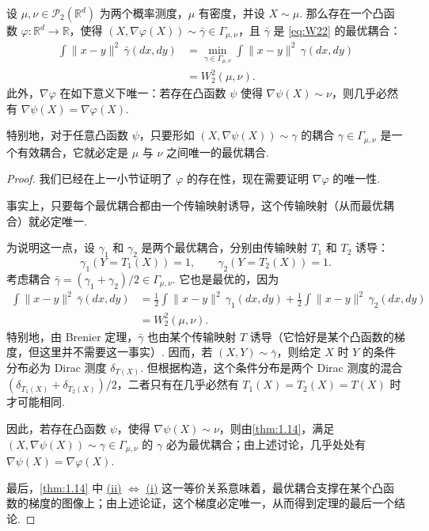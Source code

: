 \begin{theorem}\label{thm:1.16}
设 $\mu,\nu\in\mathcal{P}_2(\mathbb{R}^d)$ 为两个概率测度，$\mu$ 有密度，并设 $X\sim\mu$. 那么存在一个凸函数 $\varphi:\mathbb{R}^d\to\mathbb{R}$，使得 $(X,\nabla\varphi(X))\sim\bar\gamma\in\Gamma_{\mu,\nu}$，且 $\bar\gamma$ 是 \eqref{eq:W22} 的最优耦合：
$$
\begin{aligned}
\int\|x-y\|^2\,\bar\gamma(dx,dy)
&=\min_{\gamma\in\Gamma_{\mu,\nu}}\int\|x-y\|^2\,\gamma(dx,dy)\\
&=W_2^2(\mu,\nu).
\end{aligned}
$$
此外，$\nabla\varphi$ 在如下意义下唯一：若存在凸函数 $\psi$ 使得 $\nabla\psi(X)\sim\nu$，则几乎必然有 $\nabla\psi(X)=\nabla\varphi(X)$.

特别地，对于任意凸函数 $\psi$，只要形如 $(X,\nabla\psi(X))\sim\gamma$ 的耦合 $\gamma\in\Gamma_{\mu,\nu}$ 是一个有效耦合，它就必定是 $\mu$ 与 $\nu$ 之间唯一的最优耦合.
\end{theorem}
\begin{proof}
我们已经在上一小节证明了 $\varphi$ 的存在性，现在需要证明 $\nabla\varphi$ 的唯一性.

事实上，只要每个最优耦合都由一个传输映射诱导，这个传输映射（从而最优耦合）就必定唯一.

为说明这一点，设 $\gamma_1$ 和 $\gamma_2$ 是两个最优耦合，分别由传输映射 $T_1$ 和 $T_2$ 诱导：
$$
\gamma_1(Y=T_1(X))=1,\qquad
\gamma_2(Y=T_2(X))=1.
$$
考虑耦合 $\bar\gamma=(\gamma_1+\gamma_2)/2\in\Gamma_{\mu,\nu}$. 它也是最优的，因为
$$
\begin{aligned}
\int\|x-y\|^2\,\bar\gamma(dx,dy)
&=\frac12\int\|x-y\|^2\,\gamma_1(dx,dy)
+\frac12\int\|x-y\|^2\,\gamma_2(dx,dy)\\
&=W_2^2(\mu,\nu).
\end{aligned}
$$
特别地，由 Brenier 定理，$\bar\gamma$ 也由某个传输映射 $T$ 诱导（它恰好是某个凸函数的梯度，但这里并不需要这一事实）. 因而，若 $(X,Y)\sim\bar\gamma$，则给定 $X$ 时 $Y$ 的条件分布必为 Dirac 测度 $\delta_{T(X)}$. 但根据构造，这个条件分布是两个 Dirac 测度的混合 $(\delta_{T_1(X)}+\delta_{T_2(X)})/2$，二者只有在几乎必然有 $T_1(X)=T_2(X)=T(X)$ 时才可能相同.

因此，若存在凸函数 $\psi$，使得 $\nabla\psi(X)\sim\nu$，则由\autoref{thm:1.14}，满足 $(X,\nabla\psi(X))\sim\gamma\in\Gamma_{\mu,\nu}$ 的 $\gamma$ 必为最优耦合；由上述讨论，几乎处处有 $\nabla\psi(X)=\nabla\varphi(X)$.

最后，\autoref{thm:1.14} 中
\hyperref[item:1.14.ii]{(ii)} $\iff$ \hyperref[item:1.14.i]{(i)}
这一等价关系意味着，最优耦合支撑在某个凸函数的梯度的图像上；由上述论证，这个梯度必定唯一，从而得到定理的最后一个结论.
\end{proof}

